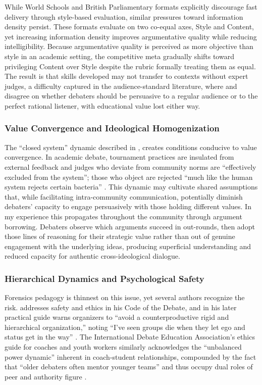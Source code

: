 While World Schools and British Parliamentary formats explicitly discourage fast delivery through style-based evaluation, similar pressures toward information density persist. These formats evaluate on two co-equal axes, Style and Content, yet increasing information density improves argumentative quality while reducing intelligibility. Because argumentative quality is perceived as more objective than style in an academic setting, the competitive meta gradually shifts toward privileging Content over Style despite the rubric formally treating them as equal. The result is that skills developed may not transfer to contexts without expert judges, a difficulty captured in the audience-standard literature, where \textcite{hicks1998public} and \textcite{weiss2002audience} disagree on whether debaters should be persuasive to a regular audience or to the perfect rational listener, with educational value lost either way.

\subsubsection{Value Convergence and Ideological Homogenization}

The ``closed system'' dynamic described in \textcite{combs2002applying}, creates conditions conducive to value convergence. In academic debate, tournament practices are insulated from external feedback and judges who deviate from community norms are ``effectively excluded from the system''; those who object are rejected ``much like the human system rejects certain bacteria'' \parencite[p.~40]{combs2002applying}. This dynamic may cultivate shared assumptions that, while facilitating intra-community communication, potentially diminish debaters' capacity to engage persuasively with those holding different values. In my experience this propagates throughout the community through argument borrowing. Debaters observe which arguments succeed in out-rounds, then adopt those lines of reasoning for their strategic value rather than out of genuine engagement with the underlying ideas, producing superficial understanding and reduced capacity for authentic cross-ideological dialogue.


\subsubsection{Hierarchical Dynamics and Psychological Safety}

Forensics pedagogy is thinnest on this issue, yet several authors recognize the risk. \textcite{snider1999code} addresses safety and ethics in his Code of the Debate, and in his later practical guide warns organizers to ``avoid a counterproductive rigid and hierarchical organization,'' noting ``I've seen groups die when they let ego and status get in the way'' \parencite[p.~36]{snider2014sparking}. The International Debate Education Association's ethics guide for coaches and youth workers similarly acknowledges the ``unbalanced power dynamic'' inherent in coach-student relationships, compounded by the fact that ``older debaters often mentor younger teams'' and thus occupy dual roles of peer and authority figure \parencite{idea2024ethics}.

